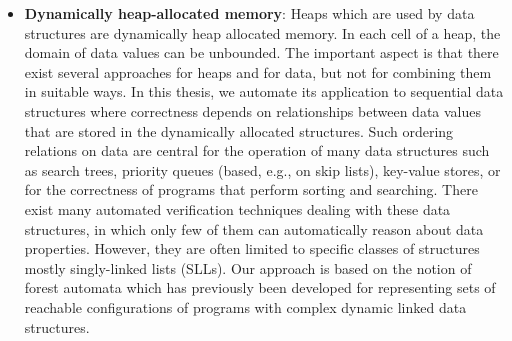\begin{itemize}
\item {\bf Dynamically heap-allocated memory}: Heaps which are used by data structures are dynamically heap allocated memory. In each cell of a heap, the domain of data values can be unbounded.
   The important aspect is that there
    exist several approaches for heaps and for data, but not for combining them in suitable ways. In this thesis, we automate its application to sequential data structures where correctness depends on relationships between data values that are stored in the dynamically allocated structures. Such ordering relations on data are central for the operation of many data structures such as search trees, priority queues (based, e.g., on skip lists), key-value stores, or for the correctness of programs that perform sorting and searching. 
 There exist many automated verification techniques dealing with these data structures, in which only few of them can automatically reason about data properties. However, they are often limited to specific classes of structures  mostly singly-linked lists (SLLs). Our approach is based on the notion of forest automata which has previously been developed for representing sets of reachable configurations of programs with complex dynamic linked data structures.


\end{itemize}
